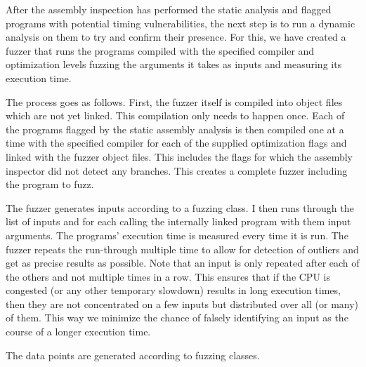 After the assembly inspection has performed the static analysis and flagged programs with potential timing vulnerabilities, the next step is to run a dynamic analysis on them to try and confirm their presence. For this, we have created a fuzzer that runs the programs compiled with the specified compiler and optimization levels fuzzing the arguments it takes as inputs and measuring its execution time. 

The process goes as follows. First, the fuzzer itself is compiled into object files which are not yet linked. This compilation only needs to happen once. Each of the programs flagged by the static assembly analysis is then compiled one at a time with the specified compiler for each of the supplied optimization flags and linked with the fuzzer object files. This includes the flags for which the assembly inspector did not detect any branches. This creates a complete fuzzer including the program to fuzz.

The fuzzer generates inputs according to a fuzzing class. I then runs through the list of inputs and for each calling the internally linked program with them input arguments. The programs' execution time is measured every time it is run. The fuzzer repeats the run-through multiple time to allow for detection of outliers and get as precise results as possible. Note that an input is only repeated after each of the others and not multiple times in a row. This ensures that if the CPU is congested (or any other temporary slowdown) results in long execution times, then they are not concentrated on a few inputs but distributed over all (or many) of them. This way we minimize the chance of falsely identifying an input as the course of a longer execution time.


The data points are generated according to fuzzing classes. 

